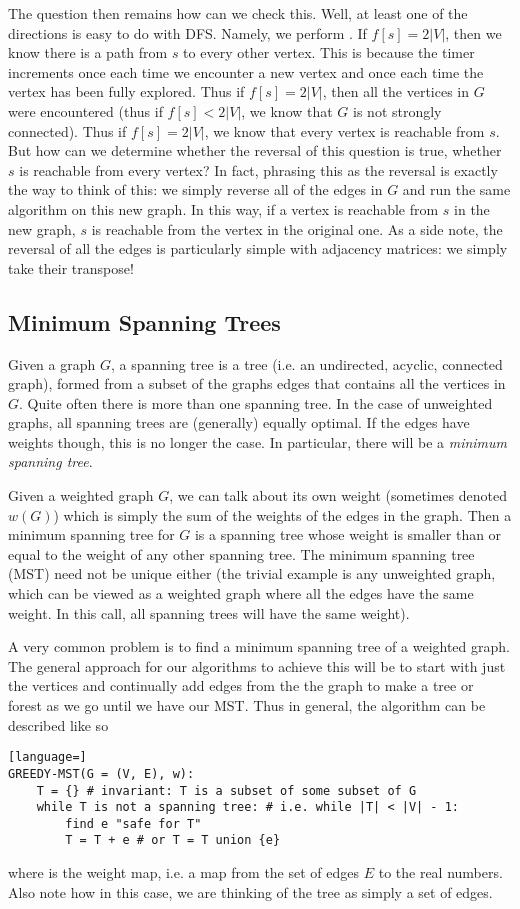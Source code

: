 The question then remains how can we check this. Well, at least one of the directions is easy to do with DFS. Namely, we perform . If $f[s] = 2|V|$, then we know there is a path from $s$ to every other vertex. This is because the timer increments once each time we encounter a new vertex and once each time the vertex has been fully explored. Thus if $f[s] = 2|V|$, then all the vertices in $G$ were encountered (thus if $f[s] < 2 \left|V\right|$, we know that $G$ is not strongly connected). Thus if $f[s] = 2\left|V\right|$, we know that every vertex is reachable from $s$. But how can we determine whether the reversal of this question is true, whether $s$ is reachable from every vertex? In fact, phrasing this as the reversal is exactly the way to think of this: we simply reverse all of the edges in $G$ and run the same algorithm on this new graph. In this way, if a vertex is reachable from $s$ in the new graph, $s$ is reachable from the vertex in the original one. As a side note, the reversal of all the edges is particularly simple with adjacency matrices: we simply take their transpose!

\subsection{Minimum Spanning Trees}
Given a graph $G$, a spanning tree is a tree (i.e. an undirected, acyclic, connected graph), formed from a subset of the graphs edges that contains all the vertices in $G$. Quite often there is more than one spanning tree. In the case of unweighted graphs, all spanning trees are (generally) equally optimal. If the edges have weights though, this is no longer the case. In particular, there will be a \textit{minimum spanning tree}.

Given a weighted graph $G$, we can talk about its own weight (sometimes denoted $w(G)$) which is simply the sum of the weights of the edges in the graph. Then a minimum spanning tree for $G$ is a spanning tree whose weight is smaller than or equal to the weight of any other spanning tree. The minimum spanning tree (MST) need not be unique either (the trivial example is any unweighted graph, which can be viewed as a weighted graph where all the edges have the same weight. In this call, all spanning trees will have the same weight).

A very common problem is to find a minimum spanning tree of a weighted graph. The general approach for our algorithms to achieve this will be to start with just the vertices and continually add edges from the the graph to make a tree or forest as we go until we have our MST. Thus in general, the algorithm can be described like so
\begin{lstlisting}[language=]
GREEDY-MST(G = (V, E), w):
    T = {} # invariant: T is a subset of some subset of G
    while T is not a spanning tree: # i.e. while |T| < |V| - 1:
        find e "safe for T"
        T = T + e # or T = T union {e}
\end{lstlisting}
where  is the weight map, i.e. a map from the set of edges $E$ to the real numbers. Also note how in this case, we are thinking of the tree as simply a set of edges.

